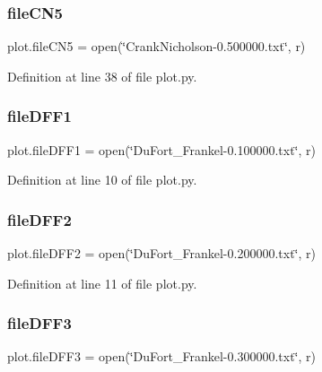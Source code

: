 \mbox{\label{namespaceplot_ae62fee042a31f751f011daa040aadd95}} 
\subsubsection{file\+C\+N5}
{\footnotesize\ttfamily plot.\+file\+C\+N5 = open(\char`\"{}Crank\+Nicholson-\/0.\+500000.txt\char`\"{}, \textquotesingle{}r\textquotesingle{})}



Definition at line 38 of file plot.\+py.

\mbox{\label{namespaceplot_a360df7942ab4e510913b96a83e34615c}} 
\subsubsection{file\+D\+F\+F1}
{\footnotesize\ttfamily plot.\+file\+D\+F\+F1 = open(\char`\"{}Du\+Fort\+\_\+\+Frankel-\/0.\+100000.txt\char`\"{}, \textquotesingle{}r\textquotesingle{})}



Definition at line 10 of file plot.\+py.

\mbox{\label{namespaceplot_a32a59837011509ade717e92f5ded28c2}} 
\subsubsection{file\+D\+F\+F2}
{\footnotesize\ttfamily plot.\+file\+D\+F\+F2 = open(\char`\"{}Du\+Fort\+\_\+\+Frankel-\/0.\+200000.txt\char`\"{}, \textquotesingle{}r\textquotesingle{})}



Definition at line 11 of file plot.\+py.

\mbox{\label{namespaceplot_ac63e02144a0e11fff0a173f5d1976bd8}} 
\subsubsection{file\+D\+F\+F3}
{\footnotesize\ttfamily plot.\+file\+D\+F\+F3 = open(\char`\"{}Du\+Fort\+\_\+\+Frankel-\/0.\+300000.txt\char`\"{}, \textquotesingle{}r\textquotesingle{})}



